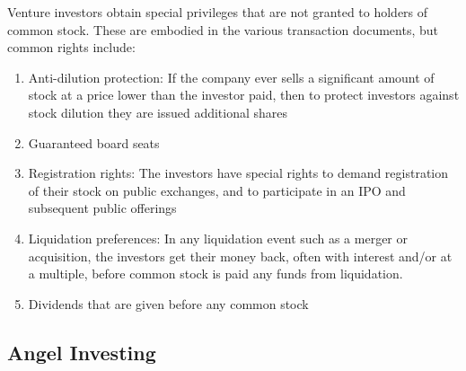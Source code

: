 \documentclass{article}
\begin{document}
    \begin{definition}
      Venture investors obtain special privileges that are not granted to holders of common stock. These are embodied in the various transaction documents, but common rights include: 
      \begin{enumerate}
        \item Anti-dilution protection: If the company ever sells a significant amount of stock at a price lower than the investor paid, then to protect investors against stock dilution they are issued additional shares
        \item Guaranteed board seats
        \item Registration rights: The investors have special rights to demand registration of their stock on public exchanges, and to participate in an IPO and subsequent public offerings
        \item Liquidation preferences: In any liquidation event such as a merger or acquisition, the investors get their money back, often with interest and/or at a multiple, before common stock is paid any funds from liquidation.
        \item Dividends that are given before any common stock
      \end{enumerate}
    \end{definition}

  \subsection{Angel Investing}
\end{document}

